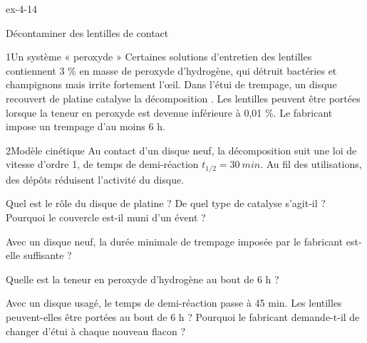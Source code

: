 \begin{blocLivre}{ex-4-14}
\begin{exercice}[3]{Décontaminer des lentilles de contact}
\begin{docu}{1}{Un système « peroxyde »}
Certaines solutions d'entretien des lentilles contiennent 3 \% en masse de peroxyde d'hydrogène, qui détruit
bactéries et champignons mais irrite fortement l'œil. Dans l'étui de trempage, un disque recouvert de platine catalyse
la décomposition . Les lentilles peuvent être portées lorsque la teneur en peroxyde est
devenue inférieure à 0,01 \%. Le fabricant impose un trempage d'au moins 6 h.
\end{docu}
\begin{docu}{2}{Modèle cinétique}
Au contact d'un disque neuf, la décomposition suit une loi de vitesse d'ordre 1, de temps de demi-réaction
$t_{1/2}=\qty{30}{min}$. Au fil des utilisations, des dépôts réduisent l'activité du disque.
\end{docu}
\begin{questions}
\item Quel est le rôle du disque de platine ? De quel type de catalyse s'agit-il ? Pourquoi le couvercle est-il muni d'un évent ?
\item \initiative Avec un disque neuf, la durée minimale de trempage imposée par le fabricant est-elle suffisante ?
\item Quelle est la teneur en peroxyde d'hydrogène au bout de 6 h ?
\item Avec un disque usagé, le temps de demi-réaction passe à 45 min. Les lentilles peuvent-elles être portées au bout
de 6 h ? Pourquoi le fabricant demande-t-il de changer d'étui à chaque nouveau flacon ?
\end{questions}
\end{exercice}
\end{blocLivre}
